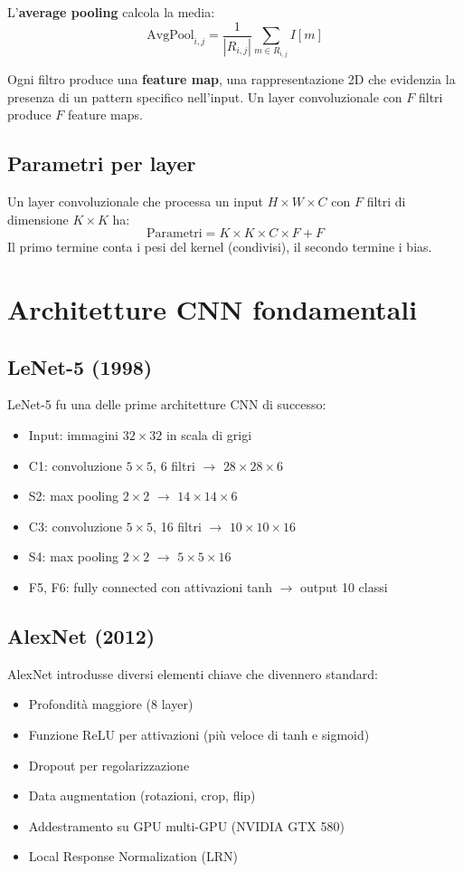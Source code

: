 L'\textbf{average pooling} calcola la media:
\[
\text{AvgPool}_{i,j} = \frac{1}{|R_{i,j}|} \sum_{m \in R_{i,j}} I[m]
\]

Ogni filtro produce una \textbf{feature map}, una rappresentazione 2D che evidenzia la presenza di un pattern specifico nell'input. Un layer convoluzionale con $F$ filtri produce $F$ feature maps.

\subsection{Parametri per layer}

Un layer convoluzionale che processa un input $H \times W \times C$ con $F$ filtri di dimensione $K \times K$ ha:
\[
\text{Parametri} = K \times K \times C \times F + F
\]
Il primo termine conta i pesi del kernel (condivisi), il secondo termine i bias.

\section{Architetture CNN fondamentali}

\subsection{LeNet-5 (1998)}

LeNet-5 fu una delle prime architetture CNN di successo:
\begin{itemize}
\item Input: immagini $32 \times 32$ in scala di grigi
\item C1: convoluzione $5 \times 5$, 6 filtri $\rightarrow$ $28 \times 28 \times 6$
\item S2: max pooling $2 \times 2$ $\rightarrow$ $14 \times 14 \times 6$
\item C3: convoluzione $5 \times 5$, 16 filtri $\rightarrow$ $10 \times 10 \times 16$
\item S4: max pooling $2 \times 2$ $\rightarrow$ $5 \times 5 \times 16$
\item F5, F6: fully connected con attivazioni tanh $\rightarrow$ output 10 classi
\end{itemize}

\subsection{AlexNet (2012)}

AlexNet introdusse diversi elementi chiave che divennero standard:
\begin{itemize}
\item Profondità maggiore (8 layer)
\item Funzione ReLU per attivazioni (più veloce di tanh e sigmoid)
\item Dropout per regolarizzazione
\item Data augmentation (rotazioni, crop, flip)
\item Addestramento su GPU multi-GPU (NVIDIA GTX 580)
\item Local Response Normalization (LRN)
\end{itemize}

